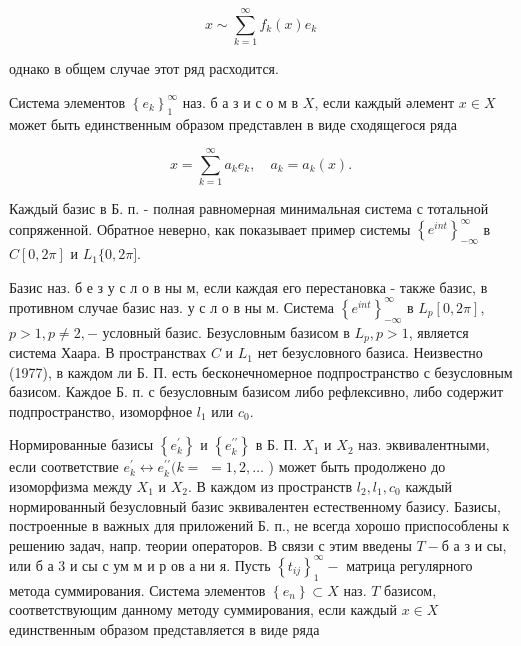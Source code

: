 \documentclass[10pt]{article}
\begin{document}
\[

x \sim \sum_{k=1}^{\infty} f_{k}(x) e_{k}

\]



однако в общем случае этот ряд расходится.



Система элементов $\left\{e_{k}\right\}_{1}^{\infty}$ наз. б а з и с о м в $X$, если каждый әлемент $x \in X$ может быть единственным образом представлен в виде сходящегося ряда



\[

x=\sum_{k=1}^{\infty} a_{k} e_{k}, \quad a_{k}=a_{k}(x) .

\]



Каждый базис в Б. п. - полная равномерная минимальная система с тотальной сопряженной. Обратное неверно, как показывает пример системы $\left\{e^{i n t}\right\}_{-\infty}^{\infty}$ в $C[0,2 \pi]$ и $L_{1}\{0,2 \pi]$.



Базис наз. б е з у с л о в ны м, если каждая его перестановка - также базис, в противном случае базис наз. у с л о в ны м. Система $\left\{e^{i n t}\right\}_{-\infty}^{\infty}$ в $L_{p}[0,2 \pi]$, $p>1, p \neq 2,-$ условный базис. Безусловным базисом в $L_{p}, p>1$, является система Хаара. В пространствах $C$ и $L_{1}$ нет безусловного базиса. Неизвестно (1977), в каждом ли Б. П. есть бесконечномерное подпространство с безусловным базисом. Каждое Б. п. с безусловным базисом либо рефлексивно, либо содержит подпространство, изоморфное $l_{1}$ или $c_{0}$.



Нормированные базисы $\left\{e_{k}^{\prime}\right\}$ и $\left\{e_{k}^{\prime \prime}\right\}$ в Б. П. $X_{1}$ и $X_{2}$ наз. эквивалентными, если соответствие $e_{k}^{\prime} \leftrightarrow e_{k}^{\prime \prime}(k=$ $=1,2, \ldots$ ) может быть продолжено до изоморфизма между $X_{1}$ и $X_{2}$. В каждом из пространств $l_{2}, l_{1}, c_{0}$ каждый нормированный безусловный базис эквивалентен естественному базису. Базисы, построенные в важных для приложений Б. п., не всегда хорошо приспособлены к решению задач, напр. теории операторов. В связи с этим введены $T-б$ а з и сы, или б а 3 и сы с ум м и р ов а ни я. Пусть $\left\{t_{i j}\right\}_{1}^{\infty}-$ матрица регулярного метода суммирования. Система элементов $\left\{e_{n}\right\} \subset X$ наз. $T$ базисом, соответствующим данному методу суммирования, если каждый $x \in X$ единственным образом представляется в виде ряда
\end{document}
